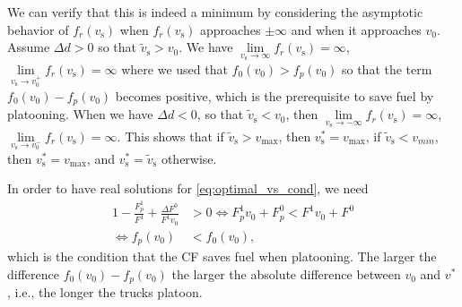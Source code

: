 \documentclass[letterpaper,10pt,conference,twocolumn]{IEEEtran}
\newcommand{\op}[1]{\mathrm{#1}}
\theoremstyle{definition}
\begin{document}
We can verify that this is indeed a minimum by considering the asymptotic behavior of $f_r(v_\op{s})$ when $f_r(v_\op{s})$ approaches $\pm \infty$ and when it approaches $v_0$. Assume $\Delta d > 0$ so that $\tilde{v}_\op{s} > v_0$. We have
$
 \lim\limits_{v_\op{s} \rightarrow \infty} f_r(v_\op{s}) = \infty$,$
 \lim\limits_{v_\op{s} \rightarrow v_0^+} f_r(v_\op{s}) = \infty
$
where we used that $f_0(v_0) > f_p(v_0)$ so that the term $f_0(v_0) - f_p(v_0)$ becomes positive, which is the prerequisite to save fuel by platooning. 
When we have $\Delta d < 0$, so that $\tilde{v}_\op{s} < v_0$, then
$
 \lim\limits_{v_\op{s} \rightarrow -\infty} f_r(v_\op{s}) = \infty$,$
 \lim\limits_{v_\op{s} \rightarrow v_0^-} f_r(v_\op{s}) = \infty.
$
This shows that if $\tilde{v}_\op{s} > v_{\max}$, then $v_\op{s}^* = v_{\max}$, if $\tilde{v}_\op{s} < v_{min}$, then $v_\op{s}^* = v_{\max}$, and $v_\op{s}^* = \tilde{v}_\op{s}$ otherwise.

In order to have real solutions for \eqref{eq:optimal_vs_cond}, we need
\begin{align*}
 1 - \frac{F_p^1}{F^1} + \frac{\Delta F^0}{F^1 v_0} &> 0 \Leftrightarrow
 F_p^1 v_0 + F_p^0 < F^1 v_0 + F^0\\
 \Leftrightarrow f_p(v_0) &< f_0(v_0),
\end{align*}
which is the condition that the CF saves fuel when platooning. The larger the difference $f_0(v_0) - f_p(v_0)$ the larger the absolute difference between $v_0$ and $v^*$, i.e., the longer the trucks platoon. 



\end{document}
